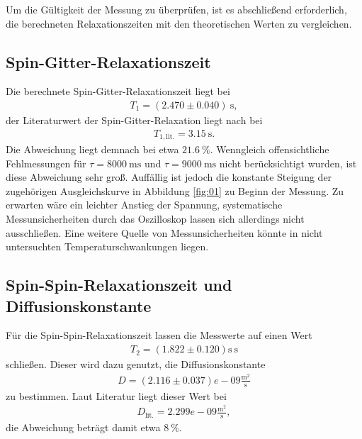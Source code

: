 \noindent Um die Gültigkeit der Messung zu überprüfen, ist es abschließend
erforderlich, die berechneten Relaxationszeiten mit den theoretischen Werten
zu vergleichen.
\subsection{Spin-Gitter-Relaxationszeit}
Die berechnete Spin-Gitter-Relaxationszeit liegt bei
\begin{align*}
  T_1 =  (2.470  \pm  0.040) \: \si{\second},
\end{align*}
\noindent der Literaturwert der Spin-Gitter-Relaxation liegt nach
\cite{temperatur_t1} bei
\begin{align*}
  T_{1,\text{lit.}} = 3.15 \: \si{\second}.
\end{align*}
\noindent Die Abweichung liegt demnach bei etwa $\SI{21.6}{\percent}$.
Wenngleich offensichtliche Fehlmessungen für $\tau = \SI{8000}{\milli\second}$
und $\tau = \SI{9000}{\milli\second}$ nicht berücksichtigt wurden, ist diese
Abweichung sehr groß. Auffällig ist jedoch die konstante Steigung der zugehörigen
Ausgleichskurve in Abbildung \ref{fig:01} zu Beginn der Messung. Zu erwarten wäre ein leichter Anstieg der 
Spannung, systematische Messunsicherheiten durch das Oszilloskop lassen sich
allerdings nicht ausschließen. Eine weitere Quelle von Messunsicherheiten könnte
in nicht untersuchten Temperaturschwankungen liegen.
\subsection{Spin-Spin-Relaxationszeit und Diffusionskonstante}
\noindent Für die Spin-Spin-Relaxationszeit lassen die Messwerte auf einen Wert
\begin{align*}
  T_2 =  (1.822  \pm  0.120) \si{\second} \: \si{\second}
\end{align*}
\noindent schließen. Dieser wird dazu genutzt, die Diffusionskonstante
\begin{align*}
  D =  (2.116 \pm 0.037)e-09 \frac{\si{\meter^2}}{\si{\second}}
\end{align*}
\noindent zu bestimmen. Laut Literatur \cite{diffusion} liegt dieser Wert bei
\begin{align*}
  D_\text{lit.} =  2.299e-09  \frac{\si{\meter^2}}{\si{\second}},
\end{align*}
\noindent die Abweichung beträgt damit etwa $\SI{8}{\percent}$.
